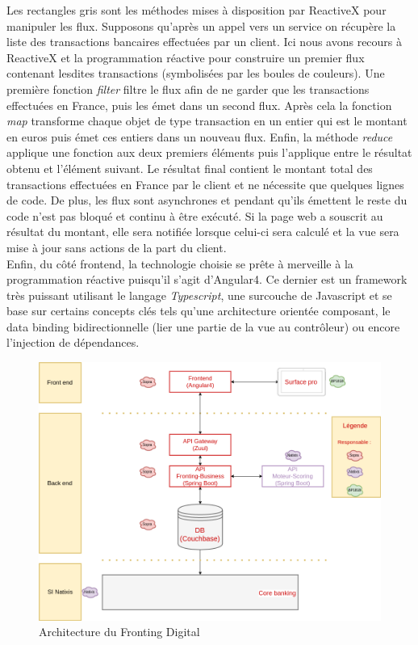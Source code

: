 	Les rectangles gris sont les méthodes mises à disposition par ReactiveX pour manipuler les flux. Supposons qu'après un appel vers un service on récupère la liste des transactions bancaires effectuées par un client. Ici nous avons recours à ReactiveX et la programmation réactive pour construire un premier flux contenant lesdites transactions (symbolisées par les boules de couleurs). Une première fonction \textit{filter} filtre le flux afin de ne garder que les transactions effectuées en France, puis les émet dans un second flux. Après cela la fonction \textit{map} transforme chaque objet de type transaction en un entier qui est le montant en euros puis émet ces entiers dans un nouveau flux. Enfin, la méthode \textit{reduce} applique une fonction aux deux premiers éléments puis l'applique entre le résultat obtenu et l'élément suivant. Le résultat final contient le montant total des transactions effectuées en France par le client et ne nécessite que quelques lignes de code. De plus, les flux sont asynchrones et pendant qu'ils émettent le reste du code n'est pas bloqué et continu à être exécuté. Si la page web a souscrit au résultat du montant, elle sera notifiée lorsque celui-ci sera calculé et la vue sera mise à jour sans actions de la part du client. \\

	Enfin, du côté frontend, la technologie choisie se prête à merveille à la programmation réactive puisqu'il s'agit d'Angular4. Ce dernier est un framework très puissant utilisant le langage \textit{Typescript}, une surcouche de Javascript et se base sur certains concepts clés tels qu'une architecture orientée composant, le data binding bidirectionnelle (lier une partie de la vue au contrôleur) ou encore l'injection de dépendances.

\begin{figure}[h!]
	\includegraphics[scale=0.50]{images/travailBP1818/architecture/archiFonc.png}
	\centering
	\caption{Architecture du Fronting Digital}
	\label{archiFoncBP1818}
\end{figure}